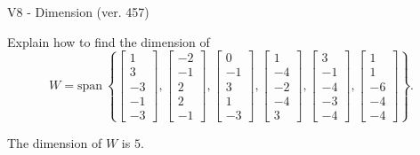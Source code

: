 \begin{exercise}
  \begin{exerciseTitle}V8 - Dimension (ver. 457)\end{exerciseTitle}
  \begin{exerciseStatement}
    Explain how to find the dimension of 
\[W=\mathrm{span}\ \left\{\left[\begin{array}{r}
1 \\
3 \\
-3 \\
-1 \\
-3
\end{array}\right] , \left[\begin{array}{r}
-2 \\
-1 \\
2 \\
2 \\
-1
\end{array}\right] , \left[\begin{array}{r}
0 \\
-1 \\
3 \\
1 \\
-3
\end{array}\right] , \left[\begin{array}{r}
1 \\
-4 \\
-2 \\
-4 \\
3
\end{array}\right] , \left[\begin{array}{r}
3 \\
-1 \\
-4 \\
-3 \\
-4
\end{array}\right] , \left[\begin{array}{r}
1 \\
1 \\
-6 \\
-4 \\
-4
\end{array}\right]\right\}.\]



  \end{exerciseStatement}
  \begin{exerciseAnswer}
   The dimension of \(W\) is  \(5\).
  


  \end{exerciseAnswer}
\end{exercise}